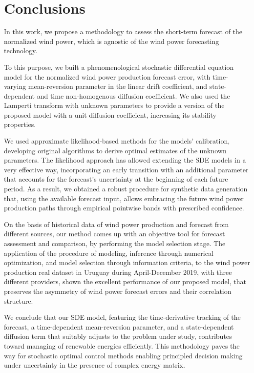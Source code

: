 \documentclass[11pt]{article}
\theoremstyle{definition}
\begin{document}


\section{Conclusions} \label{Section_7}

In this work, we propose a methodology to assess the short-term forecast of the normalized wind power, which is agnostic of the wind power forecasting technology. 

To this purpose, we built a phenomenological stochastic differential equation model for the normalized wind power production forecast error, with time-varying mean-reversion parameter in the linear drift coefficient, and state-dependent and time non-homogenous diffusion coefficient. We also used the Lamperti transform with unknown parameters to provide a version of the proposed model with a unit diffusion coefficient, increasing its stability properties.

We used approximate likelihood-based methods for the models' calibration, developing original algorithms to derive optimal estimates of the unknown parameters.
The likelihood approach has allowed extending the SDE models in a very effective way, incorporating an early transition with an additional parameter that accounts for the forecast's uncertainty at the beginning of each future period. As a result, we obtained a robust procedure for synthetic data generation that, using the available forecast input, allows embracing the future wind power production paths through empirical pointwise bands with prescribed confidence. 

On the basis of historical data of wind power production and forecast from different sources, our method comes up with an objective tool for forecast assessment and comparison, by performing the model selection stage.
The application of the procedure of modeling, inference through numerical optimization, and model selection through information criteria, to the wind power production real dataset in Uruguay during April-December 2019, with three different providers, shown the excellent performance of our proposed model, that preserves the asymmetry of wind power forecast errors and their correlation structure.
 
 We conclude that our SDE model, featuring the time-derivative tracking of the forecast, a time-dependent mean-reversion parameter, and a state-dependent diffusion term that suitably adjusts to the problem under study, contributes toward managing of renewable energies efficiently. This methodology paves the way for stochastic optimal control methods enabling principled decision making under uncertainty in the presence of complex energy matrix.
 
\end{document}
